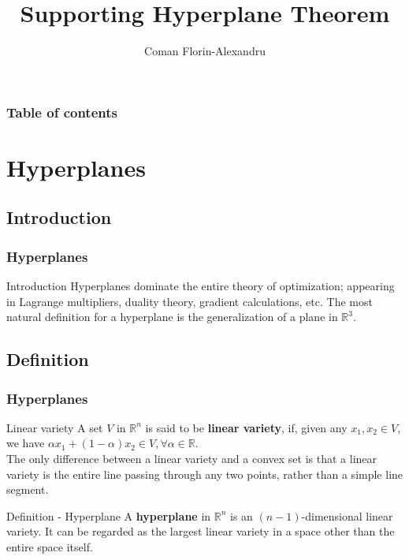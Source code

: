 \documentclass{beamer}
\begin{document}
\title{Supporting Hyperplane Theorem}  
\author{Coman Florin-Alexandru}

\begin{frame}
\titlepage
\end{frame}

\begin{frame}\frametitle{Table of contents}\tableofcontents
\end{frame}

\section{Hyperplanes}
\subsection{Introduction}
\begin{frame}\frametitle{Hyperplanes}
\begin{block}{Introduction}
Hyperplanes dominate the entire theory of optimization; appearing in Lagrange multipliers, duality theory, gradient calculations, etc. The most natural definition for a hyperplane is the generalization of a plane in $\mathbb{R}^3.$
\end{block}
\end{frame}

\subsection{Definition}
\begin{frame}\frametitle{Hyperplanes}
\begin{block}{Linear variety}
A set $V$ in $\mathbb{R}^n$ is said to be \textbf{linear variety}, if, given any $x_1, x_2 \in V$, we have $\alpha x_1 + (1 - \alpha) x_2 \in V, \forall \alpha \in \mathbb{R}.$ \\
The only difference between a linear variety and a convex set is that a linear variety is the entire line passing through any two points, rather than a simple line segment.
\end{block}
\begin{block}{Definition - Hyperplane}
A \textbf{hyperplane} in $\mathbb{R}^n$ is an $(n-1)$-dimensional linear variety. It can be regarded as the largest linear variety in a space other than the entire space itself.
\end{block}
\end{frame}
\end{document}
